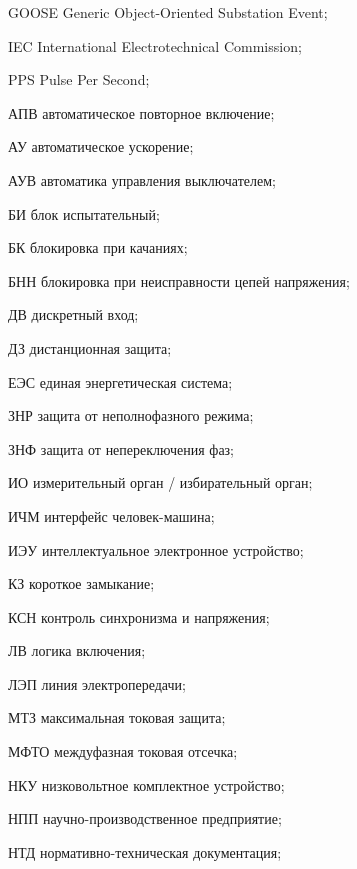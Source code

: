 \begin{list}{}%
{%
  \setlength{\labelwidth}{\abbrwidth}%
  \setlength{\labelsep}{0pt}%
  \setlength{\leftmargin}{\dimexpr\labelwidth+\labelsep\relax}%
  \setlength{\itemindent}{0pt}%
  \setlength{\parsep}{0pt}%
  \setlength{\itemsep}{0pt}
  \renewcommand{\makelabel}[1]{#1 --\hspace{\abbrgap}}%
}
\item[GOOSE] Generic Object-Oriented Substation Event;
\item[IEC]  International Electrotechnical Commission;
\item[PPS] Pulse Per Second;
\item[АПВ] автоматическое повторное включение;
\item[АУ] автоматическое ускорение;
\item[АУВ] автоматика управления выключателем;
\item[БИ] блок испытательный;
\item[БК] блокировка при качаниях;
\item[БНН] блокировка при неисправности цепей напряжения;
\item[ДВ] дискретный вход;
\item[ДЗ] дистанционная защита;
\item[ЕЭС] единая энергетическая система;
\item[ЗНР] защита от неполнофазного режима;
\item[ЗНФ] защита от непереключения фаз;
\item[ИО] измерительный орган / избирательный орган;
\item[ИЧМ] интерфейс человек-машина;
\item[ИЭУ] интеллектуальное электронное устройство;
\item[КЗ] короткое замыкание;
\item[КСН] контроль синхронизма и напряжения;
\item[ЛВ] логика включения;
\item[ЛЭП] линия электропередачи;
\item[МТЗ] максимальная токовая защита;
\item[МФТО] междуфазная токовая отсечка;
\item[НКУ] низковольтное комплектное устройство;
\item[НПП] научно-производственное предприятие;
\item[НТД] нормативно-техническая документация;

\end{list}
